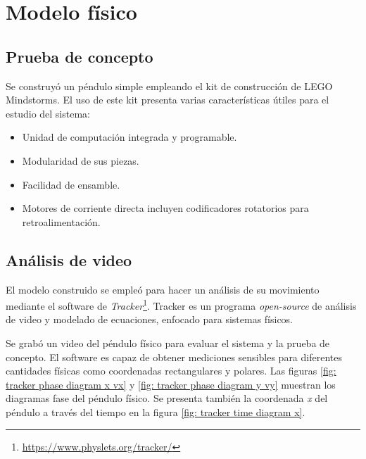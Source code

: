 \pagebreak

\section{Modelo físico}
\subsection{Prueba de concepto}

Se construyó un péndulo simple empleando 
el kit de construcción de LEGO Mindstorms.
El uso de este kit presenta varias características
útiles para el estudio del sistema:
\begin{itemize}
 \item Unidad de computación integrada y programable.
 \item Modularidad de sus piezas.
 \item Facilidad de ensamble.
 \item Motores de corriente directa incluyen 
 codificadores rotatorios para retroalimentación.
\end{itemize}

\subsection{Análisis de video}

El modelo construido se empleó para hacer un análisis 
de su movimiento mediante el software de 
\emph{Tracker}\footnote{\url{https://www.physlets.org/tracker/}}.
Tracker es un programa \emph{open-source} de análisis de 
video y modelado de ecuaciones, 
enfocado para sistemas físicos.

Se grabó un video del péndulo físico para evaluar el sistema
y la prueba de concepto. 
El software es capaz de obtener mediciones sensibles para
diferentes cantidades físicas como coordenadas rectangulares
y polares.
Las figuras \ref{fig: tracker phase diagram x vx} y 
\ref{fig: tracker phase diagram y vy}
muestran los diagramas fase del péndulo físico.
Se presenta también la coordenada \emph{x}
del péndulo a través del tiempo en la figura \ref{fig: tracker time diagram x}.

